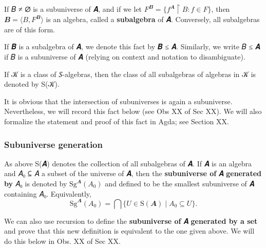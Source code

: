 \documentclass[sigplan,screen]{acmart}
\begin{document}
If 𝐵 ≠ ∅ is a subuniverse of 𝑨, and if we let \(F^{𝑩} = \{ f^{𝑨} ↾ B : f ∈ F \}\), then \(𝑩 = ⟨ B, F^{𝑩} ⟩\) is an algebra,
called a \textbf{subalgebra} of 𝑨. Conversely, all subalgebras are of this form.

If 𝑩 is a subalgebra of 𝑨, we denote this fact by 𝑩 ≤ 𝑨. Similarly, we write 𝐵 ≤ 𝑨 if 𝐵 is a subuniverse of 𝑨 (relying on context and notation to disambiguate).


If 𝒦 is a class of 𝑆-algebras, then the class of all subalgebras of algebras in 𝒦 is denoted by S(𝒦).

It is obvious that the intersection of subuniverses is again a subuniverse. Nevertheless, we will record this fact below (see Obs XX of Sec XX). %
We will also formalize the statement and proof of this fact in Agda; see Section XX. %

\subsubsection{Subuniverse generation}\label{subuniverse-generation}
As above S(𝑨) denotes the collection of all subalgebras of 𝑨. If 𝑨 is an algebra and 𝐴₀ ⊆ 𝐴 a subset of the universe of 𝑨, then the \textbf{subuniverse of} 𝑨 \textbf{generated by} 𝐴₀ is denoted by \(\mathrm{Sg}^{𝑨}(A_0)\) and defined to be the smallest subuniverse of 𝑨 containing 𝐴₀. Equivalently,
\[\mathrm{Sg}^{𝑨}(A_0)  =  ⋂ \{ U ∈ \mathrm S(𝑨) ∣ A_0 ⊆ U \}.\]

We can also use recursion to define the \textbf{subuniverse of} 𝑨 \textbf{generated by a set} and prove that this new definition is equivalent to the one given above. We will do this below in Obs. XX of Sec XX. %

\end{document}
